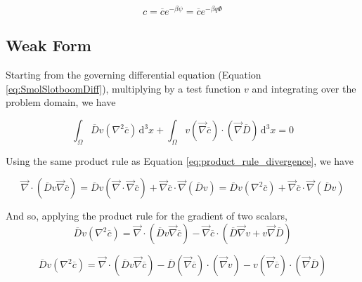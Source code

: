 \begin{equation}
  c = \overline{c} e^{-\beta \psi} = \overline{c} e^{-\beta q \Phi}
\end{equation}

\subsection{Weak Form}\label{subsec:unhom_smol_weak}

Starting from the governing differential equation (Equation \ref{eq:SmolSlotboomDiff}),
multiplying by a test function $v$ and integrating over the problem domain, we have

\begin{equation}\label{eq:SmolWeakStart}
  \int_{\Omega} \overline{D} v \left( \nabla^2 \overline{c} \right) \,\mathrm{d}^3x 
  + \int_{\Omega} v \left( \vec{\nabla} \overline{c} \right) \cdot \left( \vec{\nabla} \overline{D} \right) \,\mathrm{d}^3x = 0
\end{equation}

Using the same product rule as Equation \ref{eq:product_rule_divergence}, 
we have

\begin{equation}
  \vec{\nabla} \cdot \left( \overline{D} v \vec{\nabla} \overline{c} \right) =
  \overline{D} v \left(\vec{\nabla} \cdot \vec{\nabla} \overline{c} \right)
  + \vec{\nabla}\overline{c} \cdot \vec{\nabla} \left( \overline{D} v \right) =
  \overline{D} v \left(\nabla^2 \overline{c} \right)
  + \vec{\nabla}\overline{c} \cdot \vec{\nabla} \left( \overline{D} v \right)
\end{equation}

And so, applying the product rule for the gradient of two scalars,
\begin{equation}
  \overline{D} v \left(\nabla^2 \overline{c} \right) =
  \vec{\nabla} \cdot \left( \overline{D} v \vec{\nabla} \overline{c} \right)
  - \vec{\nabla}\overline{c} \cdot \left( \overline{D} \vec{\nabla} v + v \vec{\nabla} \overline{D} \right)
\end{equation}

\begin{equation}
  \overline{D} v \left(\nabla^2 \overline{c} \right) =
  \vec{\nabla} \cdot \left( \overline{D} v \vec{\nabla} \overline{c} \right)
  - \overline{D} \left(\vec{\nabla}\overline{c}\right) \cdot \left(\vec{\nabla}v\right)
  - v \left(\vec{\nabla}\overline{c}\right) \cdot \left(\vec{\nabla}\overline{D}\right)
\end{equation}

